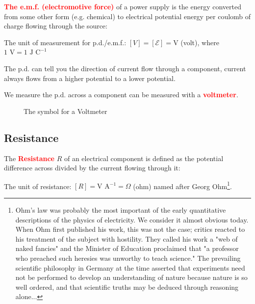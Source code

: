 \documentclass[a4paper,12pt]{book}
\newenvironment{ilight}
  {\centering
  	\vspace*{6pt}
  	\begin{tcolorbox}[colframe=Gray,colback=LightGrey!15]
  \setlength{\baselineskip}{\baselineskip}%
  }
  {\end{tcolorbox}\vspace*{-4pt}}
\newcommand{\keypoint}[1]{\textbf{\textcolor{red}{#1}}}
\renewenvironment{marginfigure}[1][]{\begin{figure}[htbp]\centering}{\end{figure}}
\newcommand{\tcbhighmath}[1]{\boxed{#1}}
\newcommand{\keypoint}[1]{\textbf{\textcolor{red}{#1}}}
\begin{document}
\begin{ilight}
	\keypoint{The e.m.f. (electromotive force)} of a power supply is the energy converted from some other form (e.g. chemical) to electrical potential energy per coulomb of charge flowing through the source: \index{e.m.f.}
\end{ilight}

The unit of measurement for p.d./e.m.f.: $[V] = [] = $ (volt), where $1  = 1 ^{-1}$

The p.d. can tell you the direction of current flow through a component, current always flows from a higher potential to a lower potential.

We measure the p.d. across a component can be measured with a \keypoint{voltmeter}. 
\begin{marginfigure}
\centering
{}
  \caption{The symbol for a Voltmeter}
\end{marginfigure}

\subsection{Resistance}

\begin{ilight}
	The \keypoint{Resistance} $R$ of an electrical component is defined as the potential difference across divided by the current flowing through it: 
\end{ilight}

The unit of resistance: $ [R] = ^{-1} = \Omega $ (ohm) named after Georg Ohm\footnote{Ohm's law was probably the most important of the early quantitative descriptions of the physics of electricity. We consider it almost obvious today. When Ohm first published his work, this was not the case; critics reacted to his treatment of the subject with hostility. They called his work a "web of naked fancies" and the Minister of Education proclaimed that "a professor who preached such heresies was unworthy to teach science." The prevailing scientific philosophy in Germany at the time asserted that experiments need not be performed to develop an understanding of nature because nature is so well ordered, and that scientific truths may be deduced through reasoning alone...}.
\end{document}
